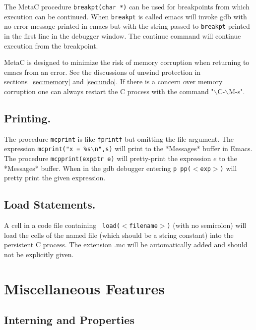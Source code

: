 \documentclass{article}
\begin{document}
The MetaC procedure {\tt breakpt(char *)} can be used for breakpoints
from which execution can be continued.  When {\tt breakpt} is called
emacs will invoke gdb with no error message printed in emacs but with the string passed to {\tt breakpt} printed in the first line in
the debugger window. The continue command will continue execution from the breakpoint.

MetaC is designed to minimize the risk of memory corruption
when returning to emacs from an error.
See the discussions of unwind protection in sections~\ref{sec:memory} and \ref{sec:undo}.
If there is a concern over memory corruption one can always restart the C process with the command "$\backslash$C-$\backslash$M-s".

\subsection {Printing.} The procedure {\tt mcprint} is like {\tt fprintf} but omitting the file argument. The expression
{\tt mcprint("x = \%s$\backslash$n",s)} will print to the *Messages* buffer in Emacs. The procedure {\tt mcpprint(expptr e)}
will pretty-print the expression $e$ to the *Messages* buffer.  When in the gdb debugger entering {\tt p pp($<$exp$>$)} will
pretty print the given expression.

\subsection{Load Statements.}  A cell in a code file containing {\tt
load($<$filename$>$)} (with no semicolon) will load the cells
of the named file (which should be a string constant) into the persistent C process.  The extension .mc
will be automatically added and should not be explicitly given.

\section{Miscellaneous Features}

\subsection{Interning and Properties}
\end{document}
